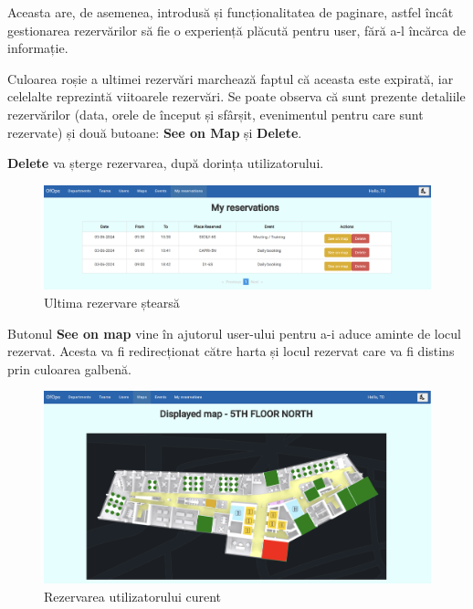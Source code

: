 Aceasta are, de asemenea, introdusă și funcționalitatea de paginare, astfel încât gestionarea rezervărilor să fie o experiență plăcută pentru user, fără a-l încărca de informație.

Culoarea roșie a ultimei rezervări marchează faptul că aceasta este expirată, iar celelalte reprezintă viitoarele rezervări. Se poate observa că sunt prezente detaliile rezervărilor (data, orele de început și sfârșit, evenimentul pentru care sunt rezervate) și două butoane: \textbf{See on Map} și \textbf{Delete}.

\textbf{Delete} va șterge rezervarea, după dorința utilizatorului.

\begin{figure}[!htb]
    \centering
    \includegraphics[width=0.9\linewidth]{images/delete.png}
    \caption{Ultima rezervare ștearsă}
    \label{fig:delete}
\end{figure}

Butonul \textbf{See on map} vine în ajutorul user-ului pentru a-i aduce aminte de locul rezervat. Acesta va fi redirecționat către harta și locul rezervat care va fi distins prin culoarea galbenă.

\begin{figure}[!htb]
    \centering
    \includegraphics[width=0.9\linewidth]{images/rezerv utiliz.png}
    \caption{Rezervarea utilizatorului curent}
    \label{fig:rezerv utiliz}
\end{figure}

